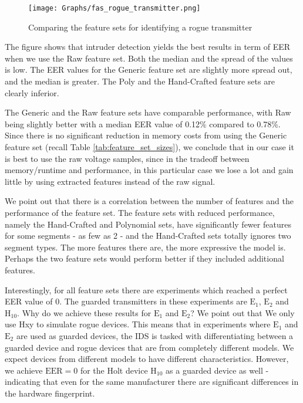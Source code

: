 \documentclass[conference]{IEEEtran}
\begin{document}
  \begin{figure}[t]
    \centering
    \texttt{[image: Graphs/fas\_rogue\_transmitter.png]}
    \caption{Comparing the feature sets for identifying a rogue transmitter}
    \label{fig:rogue_transmitter_results}
  \end{figure}
  
  The figure shows that intruder detection yields the best results in term of EER when we use the Raw feature set. Both the median and the spread of the values is low. The EER values for the Generic feature set are slightly more spread out, and the median is greater. The Poly and the Hand-Crafted feature sets are clearly inferior.
  
  The Generic and the Raw feature sets have comparable performance, with Raw being slightly better with a median EER value of 0.12\% compared to 0.78\%. Since there is no significant reduction in memory costs from using the Generic feature set (recall Table \ref{tab:feature_set_sizes}), we conclude that in our case it is best to use the raw voltage samples, since in the tradeoff between memory/runtime and performance, in this particular case we lose a lot and gain little by using extracted features instead of the raw signal.
  
  We point out that there is a correlation between the number of features and the performance of the feature set. The feature sets with reduced performance, namely the Hand-Crafted and Polynomial sets, have significantly fewer features for some segments - as few as 2 - and the Hand-Crafted sets totally ignores two segment types. The more features there are, the more expressive the model is. Perhaps the two feature sets would perform better if they included additional features.
  
  Interestingly, for all feature sets there are experiments which reached a perfect EER value of 0. The guarded transmitters in these experiments are \(\text{E}_1\), \(\text{E}_2\) and \(\text{H}_{10}\). Why do we achieve these results for \(\text{E}_1\) and \(\text{E}_2\)? We point out that We only use Hxy to simulate rogue devices. This means that in experiments where \(\text{E}_1\) and \(\text{E}_2\) are used as guarded devices, the IDS is tasked with differentiating between a guarded device and rogue devices that are from completely different models. We expect devices from different models to have different characteristics. However, we achieve \(\text{EER}=0\) for the Holt device \(\text{H}_{10}\) as a guarded device as well - indicating that even for the same manufacturer there are significant differences in the hardware fingerprint.
  
\end{document}
